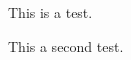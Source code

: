 \documentclass[12pt]{article}
\begin{document}
    This is a test.

    This a second test.
\end{document}
